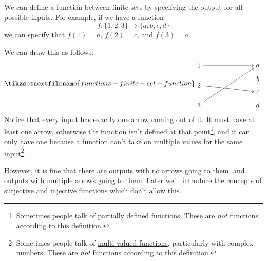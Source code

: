 \documentclass[fleqn]{LectureClass/LectureClass}
\begin{document}
    \begin{exm}{}{}
        We can define a function between finite sets by specifying the output for all possible inputs.
        For example, if we have a function
        \begin{equation}
            f \colon \{1, 2, 3\} \to \{a, b, c, d\}
        \end{equation}
        we can specify that \(f(1) = a\), \(f(2) = c\), and \(f(3) = a\).
        
        We can draw this as follows:
        \begin{equation}
            \tikzsetnextfilename{functions-finite-set-function}
            \begin{tikzpicture}[baseline=(current bounding box)]
                \node (n1) at (0, 2) {\(1\)};
                \node (n2) at (0, 1) {\(2\)};
                \node (n3) at (0, 0) {\(3\)};
                \node (a) at (3, 2) {\(a\)};
                \node (b) at (3, 1.33) {\(b\)};
                \node (c) at (3, 0.66) {\(c\)};
                \node (d) at (3, 0) {\(d\)};
                \draw [->] (n1) -- (a);
                \draw [->] (n2) -- (c);
                \draw [->] (n3) -- (a);
            \end{tikzpicture}
        \end{equation}
        Notice that every input has exactly one arrow coming out of it.
        It must have at least one arrow, otherwise the function isn't defined at that point\footnote{Sometimes people talk of \href{https://en.wikipedia.org/wiki/Partial_function}{partially defined functions}. These are \emph{not} functions according to this definition.}, and it can only have one because a function can't take on multiple values for the same input\footnote{Sometimes people talk of \href{https://en.wikipedia.org/wiki/Multivalued_function}{multi-valued functions}, particularly with complex numbers. These are \emph{not} functions according to this definition.}.
        
        However, it is fine that there are outputs with no arrows going to them, and outputs with multiple arrows going to them.
        Later we'll introduce the concepts of surjective and injective functions which don't allow this.
    \end{exm}
    
\end{document}
